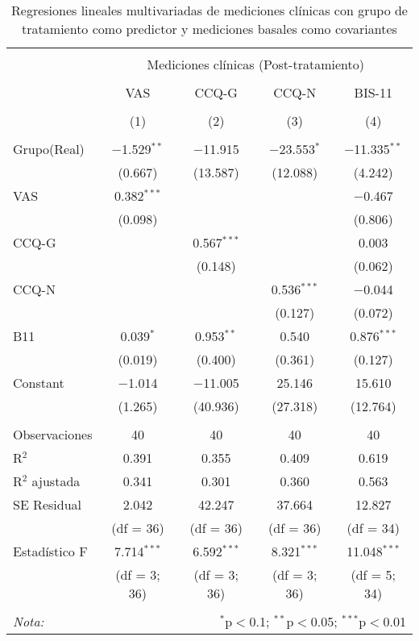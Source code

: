 \begin{table}[!ht] \centering
  \caption{Regresiones lineales multivariadas de mediciones clínicas con grupo de tratamiento como predictor y mediciones basales como covariantes}
  \label{tab:lmCl1}
\begin{tabular}{@{\extracolsep{5pt}}lcccc}
\\[-1.8ex]\hline
\hline \\[-1.8ex]
 & \multicolumn{4}{c}{Mediciones clínicas (Post-tratamiento)} \\
\cline{2-5}
\\[-1.8ex] & VAS & CCQ-G & CCQ-N & BIS-11 \\
\\[-1.8ex] & (1) & (2) & (3) & (4)\\
\hline \\[-1.8ex]
 Grupo(Real) & $-$1.529$^{**}$ & $-$11.915 & $-$23.553$^{*}$ & $-$11.335$^{**}$ \\
  & (0.667) & (13.587) & (12.088) & (4.242) \\
  VAS & 0.382$^{***}$ &  &  & $-$0.467 \\
  & (0.098) &  &  & (0.806) \\
  CCQ-G &  & 0.567$^{***}$ &  & 0.003 \\
  &  & (0.148) &  & (0.062) \\
  CCQ-N &  &  & 0.536$^{***}$ & $-$0.044 \\
  &  &  & (0.127) & (0.072) \\
  B11 & 0.039$^{*}$ & 0.953$^{**}$ & 0.540 & 0.876$^{***}$ \\
  & (0.019) & (0.400) & (0.361) & (0.127) \\
  Constant & $-$1.014 & $-$11.005 & 25.146 & 15.610 \\
  & (1.265) & (40.936) & (27.318) & (12.764) \\
 \hline \\[-1.8ex]
Observaciones & 40 & 40 & 40 & 40 \\
R$^{2}$ & 0.391 & 0.355 & 0.409 & 0.619 \\
R$^{2}$ ajustada & 0.341 & 0.301 & 0.360 & 0.563 \\
SE Residual & 2.042  & 42.247  & 37.664  & 12.827  \\
            & (df = 36) &(df = 36)&(df = 36)&(df = 34) \\
Estadístico F & 7.714$^{***}$  & 6.592$^{***}$  & 8.321$^{***}$  & 11.048$^{***}$  \\
              &(df = 3; 36)&(df = 3; 36)&(df = 3; 36)&(df = 5; 34)\\
\hline
\hline \\[-1.8ex]
\textit{Nota:}  & \multicolumn{4}{r}{$^{*}$p$<$0.1; $^{**}$p$<$0.05; $^{***}$p$<$0.01} \\
\end{tabular}
\end{table}

